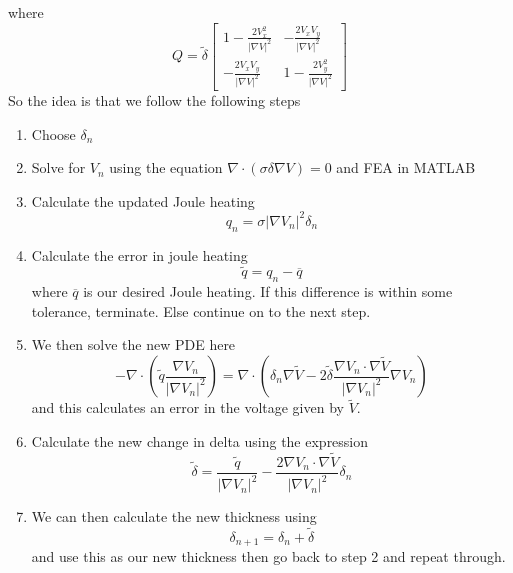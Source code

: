 \documentclass[12pt]{article}
\begin{document}
where 
\[
Q = \widetilde{\delta}
\begin{bmatrix}
\displaystyle 1-\frac{2V_x^2}{|\nabla V|^2} & \displaystyle -\frac{2V_xV_y}{|\nabla V|^2} \\[1em]
\displaystyle -\frac{2V_xV_y}{|\nabla V|^2} & \displaystyle 1-\frac{2V_y^2}{|\nabla V|^2}
\end{bmatrix}
\]
So the idea is that we follow the following steps
\begin{enumerate}
\item 
Choose $\delta_n$
\item
Solve for $V_n$ using the equation $\nabla \cdot (\sigma \delta \nabla V) = 0$ and FEA in MATLAB
\item
Calculate the updated Joule heating
\[
q_n = \sigma |\nabla V_n|^2 \delta_n
\]
\item
Calculate the error in joule heating
\[
\widetilde{q} = q_n - \overline{q}
\]
where $\overline{q}$ is our desired Joule heating.
If this difference is within some tolerance, terminate.
Else continue on to the next step.
\item
We then solve the new PDE here
\[
-\nabla \cdot \left( \widetilde{q} \frac{\nabla V_n}{|\nabla V_n|^2}\right) 
=
\nabla \cdot \left(\delta_n \nabla \widetilde{V} -2 \widetilde{\delta} \frac{\nabla {V_n}\cdot \nabla \widetilde{V}}{|\nabla {V_n}|^2}\nabla {V_n} \right) 
\]
and this calculates an error in the voltage given by $\widetilde{V}$.
\item
Calculate the new change in delta using the expression
\[
\widetilde{\delta} = \frac{\widetilde{q}}{|\nabla {V_n}|^2}-\frac{2\nabla {V_n}\cdot \nabla \widetilde{V}}{|\nabla {V_n}|^2}\delta_n
\]
\item
We can then calculate the new thickness using 
\[
\delta_{n+1} = \delta_n + \widetilde{\delta}
\]
and use this as our new thickness then go back to step 2 and repeat through.
\end{enumerate}
\end{document}
